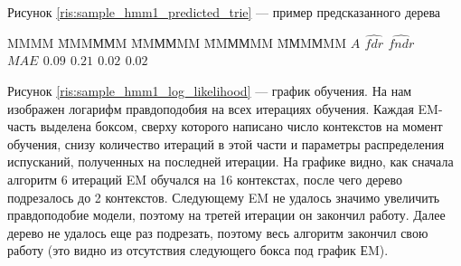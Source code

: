 \documentclass{matmex-diploma-custom}
\begin{document}
Рисунок \ref{ris:sample_hmm1_predicted_trie} --- пример предсказанного дерева
\begin{tabbing}
MMMM \= MMMММM \= MMММMM \= MMММMM \= MМMМMM \kill
\bf{}  \> {\bf $\textit{A}$} \> {\bf \lambda} \> {\bf $\hat{\textit{fdr}}$} \> {\bf $\hat{\textit{fndr}}$} \\ 
$\textit{MAE}$ \> $0.09$ \> $0.21$ \> $0.02$ \> $0.02$ \
\end{tabbing} 

Рисунок \ref{ris:sample_hmm1_log_likelihood} --- график обучения. На нам изображен логарифм правдоподобия на всех итерациях обучения. Каждая EM-часть выделена боксом, сверху которого написано число контекстов на момент обучения, снизу количество итераций в этой части и параметры распределения испусканий, полученных на последней итерации. На графике видно, как сначала алгоритм 6 итераций EM обучался на 16 контекстах, после чего дерево подрезалось до 2 контекстов. Следующему EM не удалось значимо увеличить правдоподобие модели, поэтому на третей итерации он закончил работу. Далее дерево не удалось еще раз подрезать, поэтому весь алгоритм закончил свою работу (это видно из отсутствия следующего бокса под график ЕM).
\end{document}
